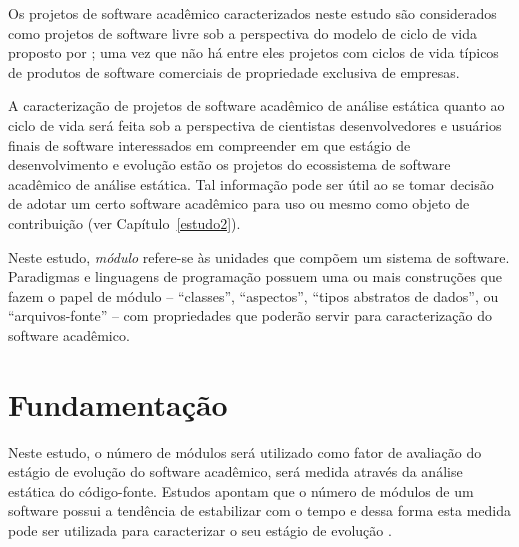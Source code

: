 Os projetos de software acadêmico caracterizados neste estudo são considerados
como projetos de software livre sob a perspectiva do modelo de ciclo de vida proposto por
; uma vez que não há entre eles projetos com
ciclos de vida típicos de produtos de software comerciais de propriedade exclusiva de empresas.


A caracterização de projetos de software acadêmico de análise estática quanto
ao ciclo de vida será feita sob a perspectiva de cientistas desenvolvedores e
usuários finais de software interessados em compreender em que estágio de
desenvolvimento e evolução estão os projetos do ecossistema de software
acadêmico de análise estática. Tal informação pode ser 
útil ao se tomar decisão de adotar um certo software acadêmico para uso ou mesmo como
objeto de contribuição (ver Capítulo~\ref{estudo2}).

Neste estudo, \textit{módulo} refere-se \`{a}s unidades que compõem um sistema de software.  
Paradigmas e linguagens de programação possuem uma ou mais
construções que fazem o papel de módulo -- ``classes'', ``aspectos'', ``tipos
abstratos de dados'', ou ``arquivos-fonte'' -- com propriedades que poderão
servir para caracterização do software acadêmico.


\section{Fundamentação} \label{estudo3:fundamentacao}

Neste estudo, o número de módulos será utilizado como fator de avaliação do
estágio de evolução do software acadêmico, será medida através da análise estática
do código-fonte. Estudos apontam que o
número de módulos de um software possui a tendência de estabilizar com o tempo
e dessa forma esta medida pode ser utilizada para caracterizar o seu estágio de
evolução \cite{capiluppi2007adapting}.

%
%


